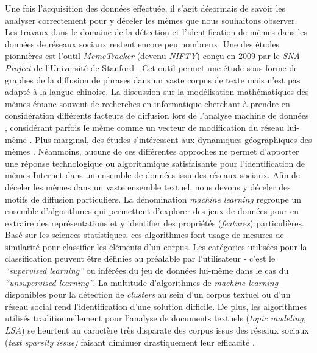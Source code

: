 Une fois l{\textquoteright}acquisition des données effectuée, il s{\textquoteright}agit désormais de savoir les analyser correctement pour y déceler les mèmes que nous souhaitons observer. Les travaux dans le domaine de la détection et l{\textquoteright}identification de mèmes dans les données de réseaux sociaux restent encore peu nombreux. Une des études pionnières est l{\textquoteright}outil \textit{MemeTracker }(devenu \textit{NIFTY}) con\c{c}u en 2009 par le \textit{SNA Project }de l{\textquoteright}Université de Stanford \citep{Leskovec2009}. Cet outil permet une étude sous forme de graphes de la diffusion de phrases dans un vaste corpus de texte mais n{\textquoteright}est pas adapté à la langue chinoise. La discussion sur la modélisation mathématiques des mèmes \citep{Ahmad2006, Nye2011} émane souvent de recherches en informatique cherchant à prendre en considération différents facteurs de diffusion lors de l{\textquoteright}analyse machine de données \citep{Zubiaga2011, Wang2011}, considérant parfois le mème comme un vecteur de modification du réseau lui-m\^eme \citep{Ienco2010}. Plus marginal, des études s{\textquoteright}intéressent aux dynamiques géographiques des mèmes \citep{Kamath2013}. Néanmoins, aucune de ces différentes approches ne permet d{\textquoteright}apporter une réponse technologique ou algorithmique satisfaisante pour l{\textquoteright}identification de mèmes Internet dans un ensemble de données issu des réseaux sociaux. Afin de déceler les mèmes dans un vaste ensemble textuel, nous devons y déceler des motifs de diffusion particuliers. La dénomination \textit{machine learning }regroupe un ensemble d{\textquoteright}algorithmes qui permettent d{\textquoteright}explorer des jeux de données pour en extraire des représentations et y identifier des propriétés (\textit{features}) particulières. Basé sur les sciences statistiques, ces algorithmes font usage de mesures de similarité pour classifier les éléments d{\textquoteright}un corpus. Les catégories utilisées pour la classification peuvent \^etre définies au préalable par l{\textquoteright}utilisateur - c{\textquoteright}est le \textit{{\textquotedblleft}supervised learning{\textquotedblright} }ou inférées du jeu de données lui-m\^eme dans le cas du \textit{{\textquotedblleft}unsupervised learning{\textquotedblright}}\citep{Breiman2001}. La multitude d{\textquoteright}algorithmes de \textit{machine learning }disponibles pour la détection de \textit{clusters} au sein d{\textquoteright}un corpus textuel ou d{\textquoteright}un réseau social \citep{Nettleton2013, Robins2013} rend l{\textquoteright}identification d{\textquoteright}une solution difficile. De plus, les algorithmes utilisés traditionnellement pour l{\textquoteright}analyse de documents textuels (\textit{topic modeling, LSA}) se heurtent au caractère très disparate des corpus issus des réseaux sociaux (\textit{text sparsity issue) }faisant diminuer drastiquement leur efficacité \citep{Hong2010}.


